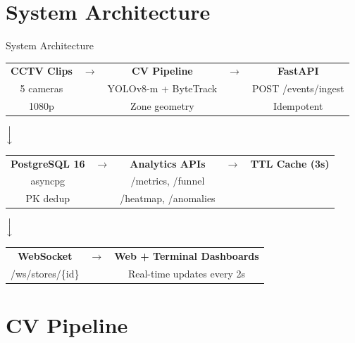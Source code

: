 \documentclass[aspectratio=169, 11pt]{beamer}
\begin{document}
\section{System Architecture}

\begin{frame}{System Architecture}
  \centering
  \small
  \begin{tabular}{ccccc}
    \textbf{CCTV Clips} & $\longrightarrow$ & \textbf{CV Pipeline} & $\longrightarrow$ & \textbf{FastAPI} \\
    5 cameras &  & YOLOv8-m + ByteTrack &  & POST /events/ingest \\
    1080p     &  & Zone geometry        &  & Idempotent \\
  \end{tabular}

  \vspace{0.3cm}
  $\Big\downarrow$
  \vspace{0.2cm}

  \begin{tabular}{ccccc}
    \textbf{PostgreSQL 16} & $\longrightarrow$ & \textbf{Analytics APIs} & $\longrightarrow$ & \textbf{TTL Cache (3s)} \\
    asyncpg &  & /metrics, /funnel &  &  \\
    PK dedup &  & /heatmap, /anomalies &  &  \\
  \end{tabular}

  \vspace{0.3cm}
  $\Big\downarrow$
  \vspace{0.2cm}

  \begin{tabular}{ccc}
    \textbf{WebSocket} & $\longrightarrow$ & \textbf{Web + Terminal Dashboards} \\
    /ws/stores/\{id\} &  & Real-time updates every 2s \\
  \end{tabular}
\end{frame}

\section{CV Pipeline}
\end{document}
